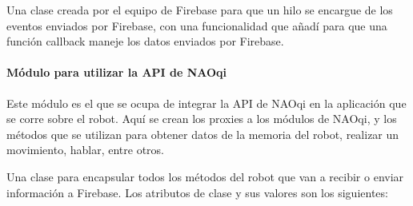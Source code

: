 Una clase creada por el equipo de Firebase para que un hilo
se encargue de los eventos enviados por Firebase, con una
funcionalidad que añadí para que una función callback maneje
los datos enviados por Firebase.



\paragraph{Módulo para utilizar la API de NAOqi}
\label{\detokenize{nao_firebase:modulo-para-utiizar-modulos-de-naoqi}}
Este módulo es el que se ocupa de integrar la API de NAOqi en la aplicación
que se corre sobre el robot. Aquí se crean los proxies a los módulos de NAOqi,
y los métodos que se utilizan para obtener datos de la memoria del robot,
realizar un movimiento, hablar, entre otros.
\newline

Una clase para encapsular todos los métodos del robot
que van a recibir o enviar información a Firebase.
Los atributos de clase y sus valores son los siguientes:

%
\begin{sphinxVerbatim}[commandchars=\\\{\}]
  
  
  
  
  
  
  \PYG{p}{[}
    \PYG{p}{[} \PYG{p}{]}
    \PYG{p}{[} \PYG{p}{]}
    \PYG{p}{[} \PYG{p}{]}
    \PYG{p}{[} \PYG{p}{]}
    \PYG{p}{[} \PYG{p}{]}
\PYG{p}{]}
\end{sphinxVerbatim}

